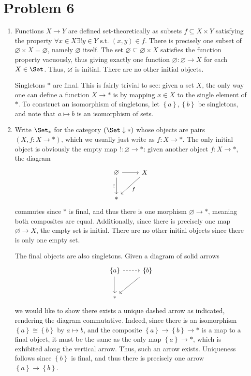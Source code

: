 \documentclass[11pt, letterpaper]{article}
\begin{document}
\section{Problem 6}
\begin{enumerate}
	\item Functions $X\to Y$ are defined set-theoretically as subsets $f \subseteq X\times Y$ satisfying the property $\forall x\in X \exists ! y\in Y \text{ s.t. } (x,y)\in f$. There is precisely one subset of $\varnothing \times X=\varnothing $, namely $\varnothing $ itself. The set $\varnothing \subseteq \varnothing \times X$ satisfies the function property vacuously, thus giving exactly one function $\varnothing : \varnothing  \to X$ for each $X\in \Set $. Thus, $\varnothing $ is initial. There are no other initial objects.

		Singletons $*$ are final. This is fairly trivial to see: given a set $X$, the only way one can define a function $X\to *$ is by mapping $x\in X$ to the single element of $*$. To construct an isomorphism of singletons, let $\left\{ a \right\} ,\left\{ b \right\} $ be singletons, and note that $a\mapsto b$ is an isomorphism of sets.
	\item Write $\Set _*$ for the category $(\Set \downarrow *)$ whose objects are pairs $(X,f : X \to *)$, which we usually just write as $f : X \to *$. The only initial object is obviously the empty map $!: \varnothing  \to *$: given another object $f : X \to *$, the diagram
		\[\begin{tikzcd}[row sep = 2.5em, column sep = 2.5em]
		\varnothing \ar[r] \ar[" ! "', d]  & X\ar[" f ", dl]  \\
		* & 
		\end{tikzcd}\]
		commutes since $*$ is final, and thus there is one morphism $\varnothing \to *$, meaning both composites are equal. Additionally, since there is precisely one map $\varnothing \to X$, the empty set is initial. There are no other initial objects since there is only one empty set.

		The final objects are also singletons. Given a diagram of solid arrows
		\[\begin{tikzcd}[row sep = 2.5em, column sep = 2.5em]
		\left\{ a \right\} \ar[dashed, r] \ar[d]  & \left\{ b \right\} \ar[dl]  \\
		* & 
		\end{tikzcd}\]
		we would like to show there exists a unique dashed arrow as indicated, rendering the diagram commutative. Indeed, since there is an isomorphism $\left\{ a \right\} \cong \left\{ b \right\} $ by $a\mapsto b$, and the composite $\left\{ a \right\} \to \left\{ b \right\} \to *$ is a map to a final object, it must be the same as the only map $\left\{ a \right\} \to *$, which is exhibited along the vertical arrow. Thus, such an arrow exists. Uniqueness follows since $\left\{ b \right\} $ is final, and thus there is precisely one arrow $\left\{ a \right\} \to \left\{ b \right\} $.


\end{enumerate}
\end{document}
